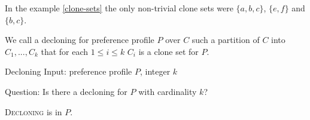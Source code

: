 \begin{exmp}
In the example \ref{clone-sets} the only non-trivial clone sets were
$\{a,b,c\}$, $\{e,f\}$ and $\{b,c\}$.
\end{exmp}

\begin{defn}[decloning]
We call a decloning for preference profile $P$ over $C$
such a partition of $C$  into $C_1, ... , C_k$
that for each $1 \leq i \leq k$ $C_i$ is a clone set for $P$.
\end{defn}


\begin{problem}{Decloning}
    Input: preference profile $P$, integer $k$

    Question: Is there a decloning for $P$ with cardinality $k$?
\end{problem}


\begin{thm}
\textsc{Decloning} is in $P$.
\end{thm}